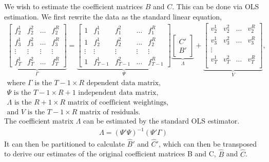 \documentclass[11pt, letterpaper]{article}\usepackage[]{graphicx}\usepackage[]{color}
\begin{document}
We wish to estimate the coefficient matrices $B$ and $C$. This can be done via OLS estimation. We first rewrite the data as the standard linear equation,
\begin{align*}
\underbrace{\begin{bmatrix}
f^1_{2} & f^2_{2} & \dots & f^R_{2}\\
f^1_{3} & f^2_{3} & \dots & f^R_{3}\\
\vdots & \vdots & \vdots & \vdots \\
f^1_{T} & f^2_{T} & \dots & f^R_{T}
\end{bmatrix}}_{\Gamma}
=
\underbrace{\begin{bmatrix}
1 & f^1_{1} & f^2_{1} & \dots & f^R_{1}\\
1 & f^1_{2} & f^2_{2} & \dots & f^R_{2}\\
\vdots & \vdots & \vdots & \vdots & \vdots \\
1 & f^1_{T-1} & f^2_{T-1} & \dots & f^R_{T-1}
\end{bmatrix}}_{\Psi}
\underbrace{\begin{bmatrix}
C'\\
B'
\end{bmatrix}}_{\Lambda}
 +
\underbrace{\begin{bmatrix}
v^1_2 & v^2_2 & \dots & v^R_2\\
v^1_3 & v^2_3 & \dots & v^R_3\\
\vdots\\
v^1_T & v^2_T & \dots & v^R_T\\
\end{bmatrix}}_{V},\\
\text{where $\Gamma$ is the $T-1 \times R$ dependent data matrix,}\\
\text{$\Psi$ is the $T-1 \times R+1$ independent data matrix,}\\
\text{$\Lambda$ is the $R+1 \times R$ matrix of coefficient weightings,}\\
\text{and $V$ is the $T-1 \times R$ matrix of residuals.}
\end{align*}
The coefficient matrix $\Lambda$ can be estimated by the standard OLS estimator.
\begin{align*}
\widehat{\Lambda} = (\Psi' \Psi)^{-1} (\Psi'\Gamma)
\end{align*}
It can then be partitioned to calculate $\widehat{B}'$ and $\widehat{C}'$, which can then be transposed to derive our estimates of the original coefficient matrices B and C, $\widehat{B}$ and $\widehat{C}$.
\end{document}
